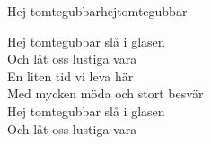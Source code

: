 \begin{song}{Hej tomtegubbar}{hejtomtegubbar}
\begin{vers}
\repopen Hej tomtegubbar slå i glasen\\
Och låt oss lustiga vara \repclose\\
En liten tid vi leva här\\
Med mycken möda och stort besvär\\
Hej tomtegubbar slå i glasen\\
Och låt oss lustiga vara\\
\end{vers}
\end{song}

